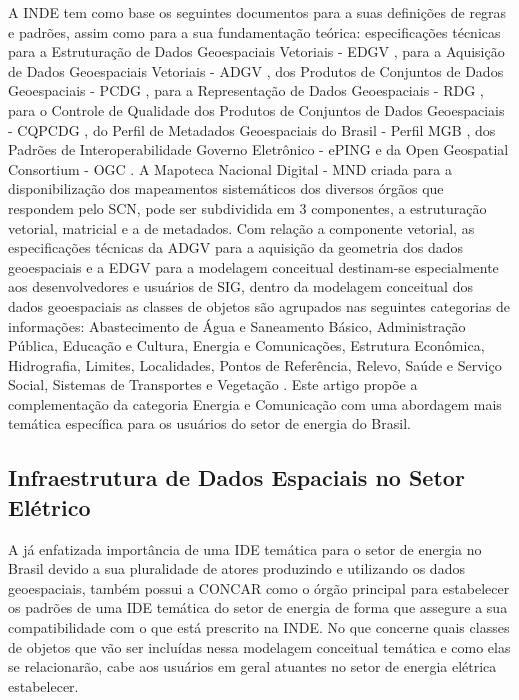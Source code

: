\documentclass[preprint,authoryear,11pt]{elsarticle}
\begin{document}
\begin{multicols}{2}
A INDE tem como base os seguintes documentos para a suas definições de regras e padrões, assim como para a sua fundamentação teórica: especificações técnicas para a Estruturação de Dados Geoespaciais Vetoriais - EDGV \citep{edgv}, para a Aquisição de Dados Geoespaciais Vetoriais - ADGV \citep{adgv}, dos Produtos de Conjuntos de Dados Geoespaciais - PCDG \citep{pcdg}, para a Representação de Dados Geoespaciais - RDG \citep{mt347001,mt347002}, para o Controle de Qualidade dos Produtos de Conjuntos de Dados Geoespaciais - CQPCDG \citep{cqpcdg}, do Perfil de Metadados Geoespaciais do Brasil - Perfil MGB \citep{pmgb}, dos Padrões de Interoperabilidade Governo Eletrônico - ePING \citep{eping} e da Open Geospatial Consortium - OGC \citep{ogc}. A Mapoteca Nacional Digital - MND criada para a disponibilização dos mapeamentos sistemáticos dos diversos órgãos que respondem pelo SCN, pode ser subdividida em 3 componentes, a estruturação vetorial, matricial e a de metadados. Com relação a componente vetorial, as especificações técnicas da ADGV para a aquisição da geometria dos dados geoespaciais e a EDGV para a modelagem conceitual destinam-se especialmente aos desenvolvedores e usuários de SIG, dentro da modelagem conceitual dos dados geoespaciais as classes de objetos são agrupados nas seguintes categorias de informações: Abastecimento de Água e Saneamento Básico, Administração Pública, Educação e Cultura, Energia e Comunicações, Estrutura Econômica, Hidrografia, Limites, Localidades, Pontos de Referência, Relevo, Saúde e Serviço Social, Sistemas de Transportes e Vegetação \citep{edgv}. Este artigo propõe a complementação da categoria Energia e Comunicação com uma abordagem mais temática específica para os usuários do setor de energia do Brasil. 

\subsection{Infraestrutura de Dados Espaciais no Setor Elétrico}
\label{sec3}

A já enfatizada importância de uma IDE temática para o setor de energia no Brasil devido a sua pluralidade de atores produzindo e utilizando os dados geoespaciais, também possui a CONCAR como o órgão principal para estabelecer os padrões de uma IDE temática do setor de energia de forma que assegure a sua compatibilidade com o que está prescrito na INDE. No que concerne quais classes de objetos que vão ser incluídas nessa modelagem conceitual temática e como elas se relacionarão, cabe aos usuários em geral atuantes no setor de energia elétrica estabelecer.       


\end{multicols}
\end{document}
